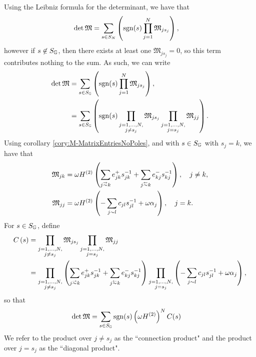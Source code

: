 Using the Leibniz formula for the determinant, we have that
\begin{align*}
	\det\mathfrak{M} &= \sum_{s\in S_N} \left(  \mathrm{sgn}(s) \prod_{j=1}^N \mathfrak{M}_{j s_j}  \right),
\end{align*}
however if $s\not\in S_{\mathbb{G}}$, then there exists at least one $\mathfrak{M}_{j s_j}=0$, so this term contributes nothing to the sum.
As such, we can write
\begin{align*}
	\det\mathfrak{M} &= \sum_{s\in S_{\mathbb{G}}} \left(  \mathrm{sgn}(s) \prod_{j=1}^N \mathfrak{M}_{j s_j}  \right), \\
	&= \sum_{s\in S_{\mathbb{G}}} \left(  \mathrm{sgn}(s) \prod_{\substack{j=1,...,N, \\ j\neq s_j}} \mathfrak{M}_{j s_j} \prod_{\substack{j=1,...,N, \\ j = s_j}} \mathfrak{M}_{jj}  \right).
\end{align*}
Using corollary \ref{cory:M-MatrixEntriesNoPoles}, and with $s\in S_{\mathbb{G}}$ with $s_j = k$, we have that
\begin{align*}
	\mathfrak{M}_{jk} &= \omega H^{(2)} \bracs{ \sum_{j\conLeft k}e_{jk}^+ s_{jk}^{-1} + \sum_{j\conRight k}e_{kj}^- s_{kj}^{-1} }, \quad j\neq k, \\
	\mathfrak{M}_{jj} &= \omega H^{(2)} \bracs{ -\sum_{j\con l}c_{jl}s_{jl}^{-1} + \omega\alpha_j }, \quad j=k.
\end{align*}
For $s\in S_{\mathbb{G}}$, define
\begin{align*}
	C\bracs{s} &= \prod_{\substack{j=1,...,N, \\ j\neq s_j}} \mathfrak{M}_{j s_j} \prod_{\substack{j=1,...,N, \\ j = s_j}} \mathfrak{M}_{jj} \\
	&= \prod_{\substack{j=1,...,N, \\ j\neq s_j}} \bracs{ \sum_{j\conLeft k}e_{jk}^+ s_{jk}^{-1} + \sum_{j\conRight k}e_{kj}^- s_{kj}^{-1} } \prod_{\substack{j=1,...,N, \\ j = s_j}} \bracs{ -\sum_{j\con l}c_{jl}s_{jl}^{-1} + \omega\alpha_j },
\end{align*}
so that 
\begin{align*}
	\det\mathfrak{M} &= \sum_{s\in S_{\mathbb{G}}} \mathrm{sgn}(s) \left(  \omega H^{(2)}  \right)^N  C(s)
\end{align*}
We refer to the product over $j\neq s_j$ as the ``connection product" and the product over $j=s_j$ as the ``diagonal product".

